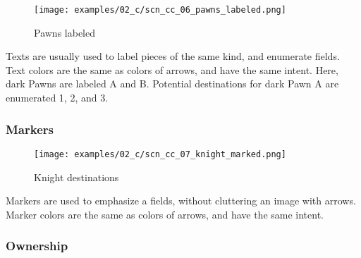\vspace*{-0.7\baselineskip}
\noindent
\begin{wrapfigure}[9]{l}{0.4\textwidth}
\centering
\texttt{[image: examples/02\_c/scn\_cc\_06\_pawns\_labeled.png]}
\vspace*{-1.4\baselineskip}
\caption{Pawns labeled}
\label{fig:scn_cc_06_pawns_labeled}
\end{wrapfigure}
Texts are usually used to label pieces of the same kind, and enumerate fields.
Text colors are the same as colors of arrows, and have the same intent.\newline
\indent
Here, dark Pawns are labeled A and B. Potential destinations for dark Pawn A are
enumerated 1, 2, and 3.

\clearpage %

\subsubsection*{Markers}
\label{sec:Classical Chess/Chessboard/Examples/Markers}

\vspace*{-0.7\baselineskip}
\noindent
\begin{wrapfigure}[6]{l}{0.4\textwidth}
\centering
\texttt{[image: examples/02\_c/scn\_cc\_07\_knight\_marked.png]}
\vspace*{-1.4\baselineskip}
\caption{Knight destinations}
\label{fig:scn_cc_07_knight_marked}
\end{wrapfigure}
Markers are used to emphasize a fields, without cluttering an image with arrows.\newline
\indent
Marker colors are the same as colors of arrows, and have the same intent.

\vspace*{4.7\baselineskip}
\subsubsection*{Ownership}
\label{sec:Classical Chess/Chessboard/Examples/Ownership}

